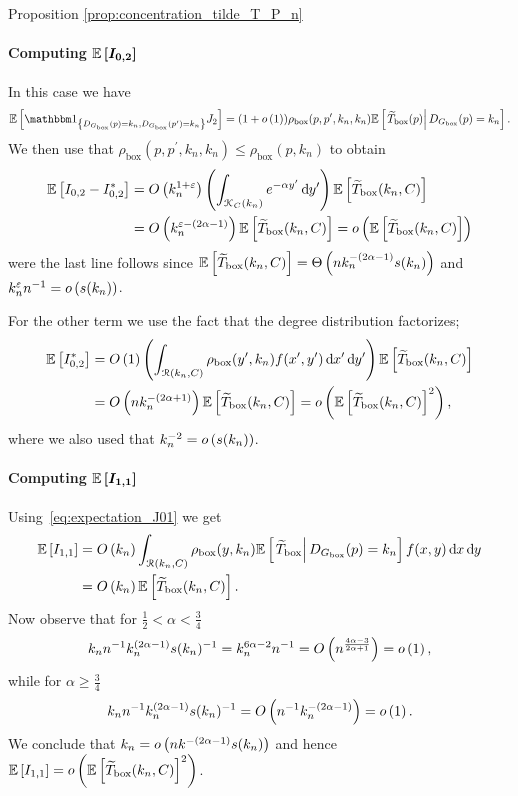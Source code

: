 \begin{proofof}{Proposition \ref{prop:concentration_tilde_T_P_n}}
\paragraph{Computing $\bm{\mathbb{E}\left[I_{0,2}\right]}$} In this case we have
\[
	\Exp{\ind{\Dbox(p) = k_n, \Dbox(p^\prime) = k_n}J_2} = (1+\smallO{1})\rho_{\text{box}}(p,p^\prime,k_n,k_n)
	\CExp{\widetilde{T}_{\text{box}}(p)}{\Dbox(p) = k_n}.
\]
We then use that $\rho_{\text{box}}(p,p^\prime,k_n,k_n) \le \rho_{\text{box}}(p,k_n)$ to obtain
\begin{align*}
	\mathbb{E}\left[I_{0,2}-I_{0,2}^\ast\right] 
	&= O\left(k_n^{1+\varepsilon}\right) \left(\int_{{\mathcal K}_{C}(k_n)} e^{-\alpha y^\prime} \operatorname{\mathrm{d}\hspace{-2pt}} y^\prime\right) 
		\mathbb{E}\left[\widetilde{T}_{\text{box}}(k_n,C)\right]\\
	&= O\left(k_n^{\varepsilon -(2\alpha - 1)}\right)\mathbb{E}\left[\widetilde{T}_{\text{box}}(k_n,C)\right]
		= o\left(\mathbb{E}\left[\widetilde{T}_{\text{box}}(k_n,C)\right]\right)
\end{align*}
were the last line follows since $\mathbb{E}\left[\widetilde{T}_{\text{box}}(k_n,C)\right] = \Theta\left(n k_n^{-(2\alpha - 1)}s(k_n)\right)$ and $k_n^{\varepsilon}n^{-1} = o\left(s(k_n)\right)$.

For the other term we use the fact that the degree distribution factorizes;
\begin{align*}
	\mathbb{E}\left[I_{0,2}^\ast\right] 
	&= O\left(1\right)\left(\int_{{\mathcal R}(k_n,C)} \rho_{\text{box}}(y^\prime,k_n) f(x^\prime,y^\prime) 
		\operatorname{\mathrm{d}\hspace{-2pt}} x^\prime \operatorname{\mathrm{d}\hspace{-2pt}} y^\prime \right)\mathbb{E}\left[\widetilde{T}_{\text{box}}(k_n,C)\right]\\
	&= O\left(n k_n^{-(2\alpha + 1)}\right)\mathbb{E}\left[\widetilde{T}_{\text{box}}(k_n,C)\right]
		= o\left(\mathbb{E}\left[\widetilde{T}_{\text{box}}(k_n,C)\right]^2\right),
\end{align*}
where we also used that $k_n^{-2} = o\left(s(k_n)\right)$.

\paragraph{Computing $\bm{\mathbb{E}\left[I_{1,1}\right]}$}

Using~\eqref{eq:expectation_J01} we get
\begin{align*}
	\mathbb{E}\left[I_{1,1}\right]
	&= O\left(k_n\right) \int_{{\mathcal R}(k_n,C)} \rho_{\text{box}}(y,k_n) \mathbb{E}\left[\left.\widetilde{T}_{\text{box}}\right|D_{G_{\mathrm{box}}}(p) = k_n\right]
		f(x,y) \operatorname{\mathrm{d}\hspace{-2pt}} x \operatorname{\mathrm{d}\hspace{-2pt}} y\\
	&= O\left(k_n\right)\mathbb{E}\left[\widetilde{T}_{\text{box}}(k_n,C)\right].
\end{align*}
Now observe that for $\frac{1}{2} < \alpha < \frac{3}{4}$
\[
	k_n n^{-1} k_n^{(2\alpha -1)} s(k_n)^{-1} = k_n^{6\alpha - 2} n^{-1}
	= O\left(n^{\frac{4\alpha - 3}{2\alpha + 1}}\right) = o\left(1\right),
\]
while for $\alpha \ge \frac{3}{4}$
\[
	k_n  n^{-1} k_n^{(2\alpha -1)} s(k_n)^{-1} = O\left(n^{-1} k_n^{-(2\alpha - 1)}\right) = o\left(1\right).
\]
We conclude that $k_n = o\left(n k^{-(2\alpha - 1)}s(k_n)\right)$ and hence $\mathbb{E}\left[I_{1,1}\right] = o\left(\mathbb{E}\left[\widetilde{T}_{\text{box}}(k_n,C)\right]^2\right)$.


\end{proofof}